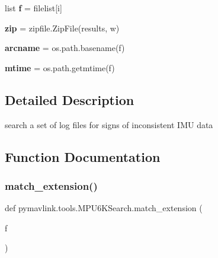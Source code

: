 \begin{DoxyCompactItemize}
list {\bfseries f} = filelist\mbox{[}i\mbox{]}
\item 
\mbox{\label{namespacepymavlink_1_1tools_1_1MPU6KSearch_a20389f5c308cc78d8368d19db6ef8b92}} 
{\bfseries zip} = zipfile.\+Zip\+File(results, \textquotesingle{}w\textquotesingle{})
\item 
\mbox{\label{namespacepymavlink_1_1tools_1_1MPU6KSearch_a363a1bdf64d3d75b1d37289d07de7386}} 
{\bfseries arcname} = os.\+path.\+basename(f)
\item 
\mbox{\label{namespacepymavlink_1_1tools_1_1MPU6KSearch_a74dfdaae82367ac45a4be38a0a325453}} 
{\bfseries mtime} = os.\+path.\+getmtime(f)
\end{DoxyCompactItemize}


\subsection{Detailed Description}
\begin{DoxyVerb}search a set of log files for signs of inconsistent IMU data
\end{DoxyVerb}
 

\subsection{Function Documentation}
\mbox{\label{namespacepymavlink_1_1tools_1_1MPU6KSearch_adb2e53c6e56de3bd2784aa39e2605d92}} 
\subsubsection{\texorpdfstring{match\+\_\+extension()}{match\_extension()}}
{\footnotesize\ttfamily def pymavlink.\+tools.\+M\+P\+U6\+K\+Search.\+match\+\_\+extension (\begin{DoxyParamCaption}\item[{}]{f }\end{DoxyParamCaption})}

